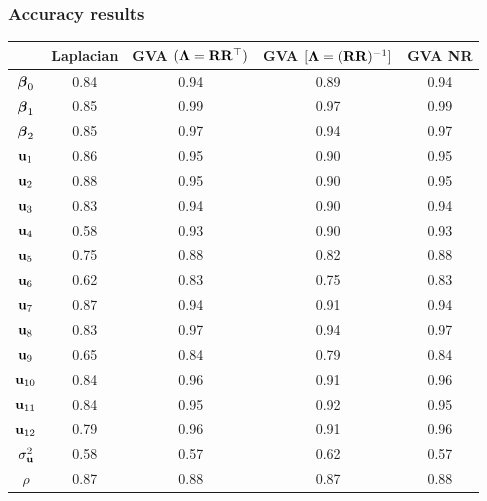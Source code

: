 \documentclass{beamer}
\begin{document}
		
	\begin{frame}
		\frametitle{Accuracy results}
		\begin{tabular}{|c|cccc|}
			\hline
			               & Laplacian & GVA $({\boldsymbol \Lambda}={\bf R} {\bf R}^\top)$ & GVA $[{\boldsymbol \Lambda}=({\bf R} {\bf R})^{-1}]$ & GVA NR \\
			\hline
			${\boldsymbol \beta}_0$     & 0.84      & 0.94                          & 0.89                            & 0.94   \\
			${\boldsymbol \beta}_1$     & 0.85      & 0.99                          & 0.97                            & 0.99   \\
			${\boldsymbol \beta}_2$     & 0.85      & 0.97                          & 0.94                            & 0.97   \\
			${\bf u}_1$        & 0.86      & 0.95                          & 0.90                            & 0.95   \\
			${\bf u}_2$        & 0.88      & 0.95                          & 0.90                            & 0.95   \\
			${\bf u}_3$        & 0.83      & 0.94                          & 0.90                            & 0.94   \\
			${\bf u}_4$        & 0.58      & 0.93                          & 0.90                            & 0.93   \\
			${\bf u}_5$        & 0.75      & 0.88                          & 0.82                            & 0.88   \\
			${\bf u}_6$        & 0.62      & 0.83                          & 0.75                            & 0.83   \\
			${\bf u}_7$        & 0.87      & 0.94                          & 0.91                            & 0.94   \\
			${\bf u}_8$        & 0.83      & 0.97                          & 0.94                            & 0.97   \\
			${\bf u}_9$        & 0.65      & 0.84                          & 0.79                            & 0.84   \\
			${\bf u}_{10}$     & 0.84      & 0.96                          & 0.91                            & 0.96   \\
			${\bf u}_{11}$     & 0.84      & 0.95                          & 0.92                            & 0.95   \\
			${\bf u}_{12}$     & 0.79      & 0.96                          & 0.91                            & 0.96   \\
			$\sigma_{\bf u}^2$ & 0.58      & 0.57                          & 0.62                            & 0.57   \\
			$\rho$         & 0.87      & 0.88                          & 0.87                            & 0.88   \\
			\hline
		\end{tabular}
	\end{frame}
		
\end{document}
